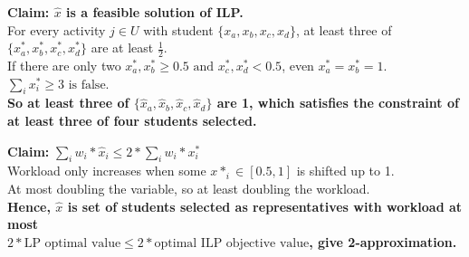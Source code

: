 \documentclass[10pt]{article}
\begin{document}
\begin{enumerate}
\begin{mdframed}
        \textbf{Claim: $\hat x$ is a feasible solution of ILP.}\\
        For every activity $j \in U$ with student $\{x_a, x_b, x_c, x_d\}$, at least three of $\{x^*_a, x^*_b, x^*_c, x^*_d\}$ are at least $\frac{1}{2}$.\\
        If there are only two $x_a^*, x_b^* \geq 0.5 \text{ and } x_c^*, x_d^* < 0.5$, even $x_a^* = x_b^* = 1$. $\sum_i x_i^* \geq 3 \text{ is false}$.\\ 
        \textbf{So at least three of $\{\hat x_a,\hat x_b, \hat x_c, \hat x_d\}$ are 1, which satisfies the constraint of at least three of four students selected.}
        
        \textbf{Claim:} $\sum_i w_i* \hat x_i \leq 2*\sum_i w_i*x^*_i$\\
        Workload only increases when some $x*_i \in [0.5,1]$ is shifted up to 1.\\
        At most doubling the variable, so at least doubling the workload.\\
        \textbf{Hence, $\hat x$ is set of students selected as representatives with workload at most\\$2*\text{LP optimal value} \leq 2*\text{optimal ILP objective value}$, give 2-approximation.}
    \end{mdframed}
\end{enumerate}
\end{document}
